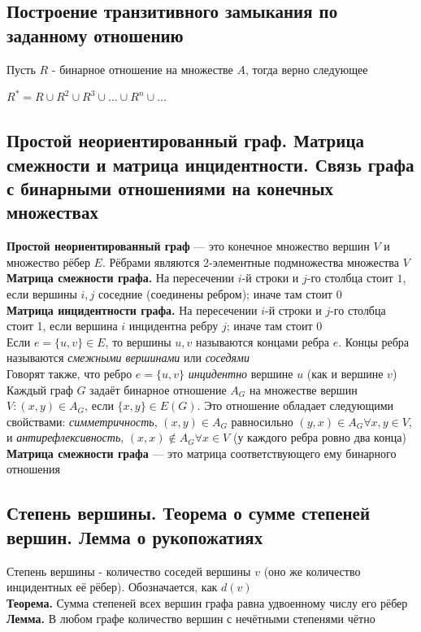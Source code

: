 \documentclass[a4paper]{article}
\begin{document}
\subsection{Построение транзитивного замыкания по заданному отношению}
\label{sec:1.63}Пусть $R$ - бинарное отношение на множестве $A$, тогда верно следующее\\[2mm]
\centerline{$R^*=R\cup R^2\cup R^3\cup\ldots\cup R^n\cup\ldots$}
\subsection{Простой неориентированный граф. Матрица смежности и матрица инцидентности. Связь графа с бинарными отношениями на конечных множествах}
\textbf{Простой неориентированный граф} — это конечное множество вершин $V$ и множество рёбер $E$. Рёбрами являются 2-элементные подмножества множества $V$\\[2mm]
\indent \textbf{Матрица смежности графа.} На пересечении $i$-й строки и $j$-го столбца стоит $1$, если вершины $i, j$ соседние (соединены ребром); иначе там стоит 0\\[2mm]
\indent \textbf{Матрица инцидентности графа.} На пересечении $i$-й строки и $j$-го столбца стоит 1, если вершина $i$ инцидентна ребру $j$; иначе там стоит 0\\[2mm]
\indent Если $e=\{u, v\} \in E$, то вершины $u, v$ называются концами ребра $e$. Концы ребра называются \textit{смежными вершинами} или \textit{соседями}\\[2mm]
\indent Говорят также, что ребро $e=\{u, v\}$ \textit{инцидентно} вершине $u$ (как и вершине $v$)\\[2mm]
\indent Каждый граф $G$ задаёт бинарное отношение $A_G$ на множестве вершин $V:(x, y) \in A_G$, если $\{x, y\} \in E(G)$. Это отношение обладает следующими свойствами: \textit{симметричность}, $(x,y) \in A_G$ равносильно $(y,x) \in A_G \forall x,y \in V$, и \textit{антирефлексивность}, $(x, x) \notin A_G\forall x \in V$ (у каждого ребра ровно два конца)\\[2mm]
\indent \textbf{Матрица смежности графа} — это матрица соответствующего ему бинарного отношения
\subsection{Степень вершины. Теорема о сумме степеней вершин. Лемма о рукопожатиях}
\label{sec:1.65}Степень вершины - количество соседей вершины $v$ (оно же количество инцидентных её рёбер). Обозначается, как $d(v)$\\[2mm]
\indent \textbf{Теорема.} Сумма степеней всех вершин графа равна удвоенному числу его рёбер\\[2mm]
\indent \textbf{Лемма.} В любом графе количество вершин с нечётными степенями чётно
\end{document}
